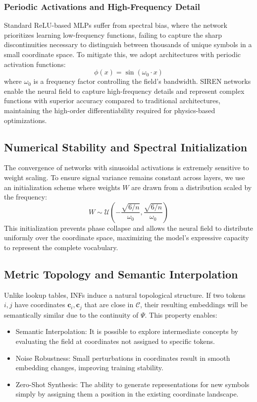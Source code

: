 \documentclass{article}
\numberwithin{equation}{section}
\begin{document}
\subsubsection{Periodic Activations and High-Frequency Detail}
Standard ReLU-based MLPs suffer from spectral bias, where the network prioritizes learning low-frequency functions, failing to capture the sharp discontinuities necessary to distinguish between thousands of unique symbols in a small coordinate space. To mitigate this, we adopt architectures with periodic activation functions:
\[
\phi(x) = \sin(\omega_0 \cdot x)
\]
where $\omega_0$ is a frequency factor controlling the field's bandwidth. SIREN networks enable the neural field to capture high-frequency details and represent complex functions with superior accuracy compared to traditional architectures, maintaining the high-order differentiability required for physics-based optimizations.

\subsection{Numerical Stability and Spectral Initialization}
The convergence of networks with sinusoidal activations is extremely sensitive to weight scaling. To ensure signal variance remains constant across layers, we use an initialization scheme where weights $W$ are drawn from a distribution scaled by the frequency:
\[
W \sim \mathcal{U}\left(-\frac{\sqrt{6/n}}{\omega_0}, \frac{\sqrt{6/n}}{\omega_0}\right)
\]
This initialization prevents phase collapse and allows the neural field to distribute uniformly over the coordinate space, maximizing the model's expressive capacity to represent the complete vocabulary.

\subsection{Metric Topology and Semantic Interpolation}
Unlike lookup tables, INFs induce a natural topological structure. If two tokens $i, j$ have coordinates $\mathbf{c}_i, \mathbf{c}_j$ that are close in $\mathcal{C}$, their resulting embeddings will be semantically similar due to the continuity of $\Psi$.
This property enables:
\begin{itemize}
\item Semantic Interpolation: It is possible to explore intermediate concepts by evaluating the field at coordinates not assigned to specific tokens.
\item Noise Robustness: Small perturbations in coordinates result in smooth embedding changes, improving training stability.
\item Zero-Shot Synthesis: The ability to generate representations for new symbols simply by assigning them a position in the existing coordinate landscape.
\end{itemize}
\end{document}
